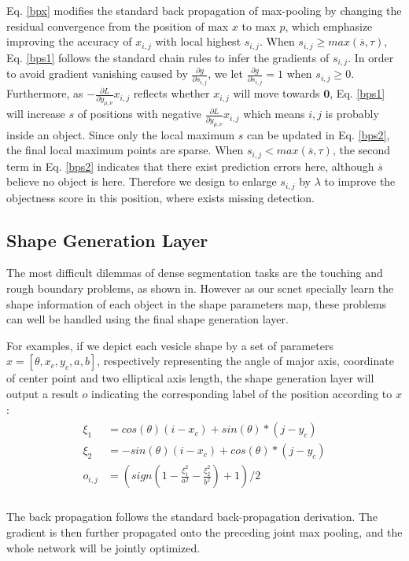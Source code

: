 \documentclass[10pt,twocolumn,letterpaper]{article}
\begin{document}
Eq. \ref{bpx} modifies the standard back propagation of max-pooling by changing the residual convergence from the position of max $x$ to max $p$, which emphasize improving the accuracy of $x_{i,j}$ with local highest $s_{i,j}$.
When $s_{i,j}\geq max(\overline{s},\tau)$, Eq. \ref{bps1} follows the standard chain rules to infer the gradients of $s_{i,j}$.
In order to avoid gradient vanishing caused by $\frac{\partial g}{\partial s_{i,j}}$, we let $\frac{\partial g}{\partial s_{i,j}}=1$ when $s_{i,j}\geq0$.
Furthermore, as $-\frac{\partial L}{\partial y_{\mu,\nu}}x_{i,j}$ reflects whether $x_{i,j}$ will move towards $\mathbf{0}$, Eq. \ref{bps1} will increase $s$ of positions with negative $\frac{\partial L}{\partial y_{\mu,\nu}}x_{i,j}$ which means ${i,j}$ is probably inside an object.
Since only the local maximum $s$ can be updated in Eq. \ref{bps2}, the final local maximum points are sparse.
When $s_{i,j}< max(\overline{s},\tau)$, the second term in Eq. \ref{bps2} indicates that there exist prediction errors here, although $\overline{s}$ believe no object is here.
Therefore we design to enlarge $s_{i,j}$  by $\lambda$ to improve the objectness score in this position, where exists missing detection.

\subsection{Shape Generation Layer}
The most difficult dilemmas of dense segmentation tasks are the touching and rough boundary problems, as shown in.
However as our scnet specially learn the shape information of each object in the shape parameters map, these problems can well be handled using the final shape generation layer.

For examples, if we depict each vesicle shape by a set of parameters $x = [\theta, x_c, y_c, a, b]$, respectively representing the angle of major axis, coordinate of center point and two elliptical axis length, the shape generation layer will output a result $o$ indicating the corresponding label of the position according to $x$:
\begin{eqnarray}\label{bps}
\begin{aligned}
\xi_1 &= cos(\theta)(i-x_c)+sin(\theta)*(j-y_c)\\
\xi_2 &= -sin(\theta)(i-x_c)+cos(\theta)*(j-y_c)\\
o_{i,j} &= (sign(1-\frac{\xi_1^2}{a^2}-\frac{\xi_2^2}{b^2})+1)/2\\
\end{aligned}
\end{eqnarray}

The back propagation follows the standard back-propagation derivation.
The gradient is then further propagated onto the preceding joint max pooling, and the whole network will be jointly optimized.




{\small


}
\end{document}
